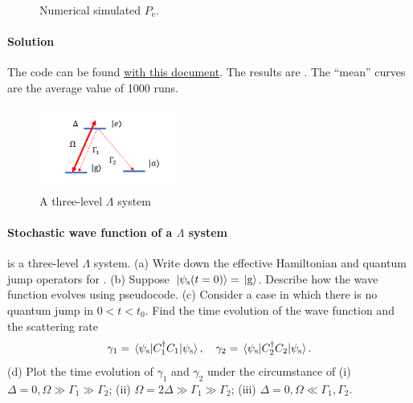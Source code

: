 \documentclass[hyperref, a4paper]{article}
\begin{document}
\begin{figure}
\begin{subfigure}{0.45\textwidth}
        \subcaption{}
    \end{subfigure}
    \caption{Numerical simulated $P_\text{e}$.}
    \label{fig:numerical-wave}
\end{figure}

\paragraph{Solution} The code can be found \href{simulation.jl}{with this document}. The results are 
. The ``mean'' curves are the average value of 1000 runs. 

\paragraph{}

\begin{figure}
    \centering
    \includegraphics[width=0.4\textwidth]{fig1.png}
    \caption{A three-level $\Lambda$ system}
    \label{fig:sys-1}
\end{figure}

\paragraph{Stochastic wave function of a $\Lambda$ system}  is a three-level $\Lambda$ system.
(a) Write down the effective Hamiltonian and quantum jump operators for .
(b) Suppose $\ket*{\psi_\text{s}(t=0)} = \ket*{\text{g}}$. Describe how the wave function evolves using pseudocode.
(c) Consider a case in which there is no quantum jump in $0 < t < t_0$. Find the time evolution of the 
wave function and the scattering rate 
\begin{equation}
    \gamma_1 = \expval*{C_1^\dagger C_1}{\psi_\text{s}}, \quad \gamma_2 = \expval*{C_2^\dagger C_2}{\psi_\text{s}}.
\end{equation}
(d) Plot the time evolution of $\gamma_1$ and $\gamma_2$ under the circumstance of
(i) $\Delta = 0, \Omega \gg \Gamma_1 \gg \Gamma_2$;
(ii) $\Omega = 2 \Delta \gg \Gamma_1 \gg \Gamma_2$;
(iii) $\Delta = 0, \Omega \ll \Gamma_1 , \Gamma_2$.
\end{document}
